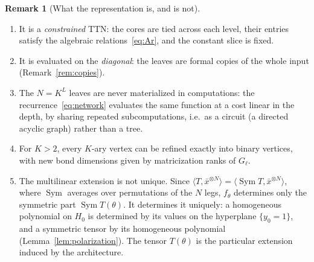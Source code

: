 \documentclass[11pt]{article}
\newcommand{\Sym}{\operatorname{Sym}}
\newcommand{\ip}[2]{\langle #1,#2\rangle}
\newcommand{\xb}{\bar{x}}
\theoremstyle{definition}
\newtheorem{remark}[theorem]{Remark}
\numberwithin{equation}{section}
\begin{document}
\begin{remark}[What the representation is, and is not]\label{rem:qualifications}
\leavevmode
\begin{enumerate}[label=(\roman*),nosep]
\item It is a \emph{constrained} TTN: the cores are tied across each level, their entries satisfy the algebraic relations~\eqref{eq:Ar}, and the constant slice is fixed.
\item It is evaluated on the \emph{diagonal}: the leaves are formal copies of the whole input (Remark~\ref{rem:copies}).
\item The $N=K^L$ leaves are never materialized in computations: the recurrence~\eqref{eq:network} evaluates the same function at a cost linear in the depth, by sharing repeated subcomputations, i.e.\ as a circuit (a directed acyclic graph) rather than a tree.
\item For $K>2$, every $K$-ary vertex can be refined exactly into binary vertices, with new bond dimensions given by matricization ranks of $G_\ell$.
\item The multilinear extension is not unique. Since $\ip{T}{\xb^{\otimes N}}=\ip{\Sym T}{\xb^{\otimes N}}$, where $\Sym$ averages over permutations of the $N$ legs, $f_\theta$ determines only the symmetric part $\Sym T(\theta)$. It determines it uniquely: a homogeneous polynomial on $H_0$ is determined by its values on the hyperplane $\{y_0=1\}$, and a symmetric tensor by its homogeneous polynomial (Lemma~\ref{lem:polarization}). The tensor $T(\theta)$ is the particular extension induced by the architecture.
\end{enumerate}
\end{remark}
\end{document}
